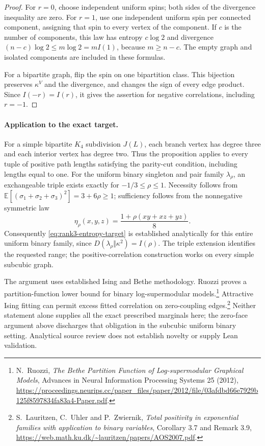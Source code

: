 \begin{proof}
For $r=0$, choose independent uniform spins; both sides of the
divergence inequality are zero.  For $r=1$, use one independent
uniform spin per connected component, assigning that spin to every
vertex of the component.  If $c$ is the number of components, this law
has entropy $c\log2$ and divergence $(n-c)\log2\leq m\log2=mI(1)$,
because $m\geq n-c$.  The empty graph and isolated components are
included in these formulas.

For a bipartite graph, flip the spin on one bipartition class.
This bijection preserves $\kappa^{V}$ and the divergence, and changes
the sign of every edge product.  Since $I(-r)=I(r)$, it gives the
assertion for negative correlations, including $r=-1$.
\end{proof}

\paragraph{Application to the exact target.}
For a simple bipartite $K_4$ subdivision $J(L)$, each branch vertex
has degree three and each interior vertex has degree two.  Thus the
proposition applies to every tuple of positive path lengths satisfying
the parity-cut condition, including lengths equal to one.
For the uniform binary singleton and pair family $\lambda_\rho$,
an exchangeable triple exists exactly for $-1/3\leq\rho\leq1$.
Necessity follows from
$\mathbb E[(\sigma_1+\sigma_2+\sigma_3)^2]=3+6\rho\geq1$;
sufficiency follows from the nonnegative symmetric law
\[
 \eta_\rho(x,y,z)=\frac{1+\rho(xy+xz+yz)}8.
\]
Consequently \eqref{eq:rank3-entropy-target} is established analytically
for this entire uniform binary family, since
$D(\lambda_\rho\Vert\kappa^2)=I(\rho)$.
The triple extension identifies the requested range; the
positive-correlation construction works on every simple subcubic graph.

The argument uses established Ising and Bethe methodology.
Ruozzi proves a partition-function lower bound for binary
log-supermodular models.\footnote{N.~Ruozzi,
\emph{The Bethe Partition Function of Log-supermodular Graphical Models},
Advances in Neural Information Processing Systems 25 (2012),
\url{https://proceedings.neurips.cc/paper_files/paper/2012/file/03afdbd66e7929b125f8597834fa83a4-Paper.pdf}.}
Attractive Ising fitting can permit excess fitted correlation on
zero-coupling edges.\footnote{S.~Lauritzen, C.~Uhler and P.~Zwiernik,
\emph{Total positivity in exponential families with application to binary variables},
Corollary 3.7 and Remark 3.9,
\url{https://web.math.ku.dk/~lauritzen/papers/AOS2007.pdf}.}
Neither statement alone supplies all the exact prescribed marginals here;
the zero-face argument above discharges that obligation in the subcubic
uniform binary setting.  Analytical source review does not establish
novelty or supply Lean validation.

